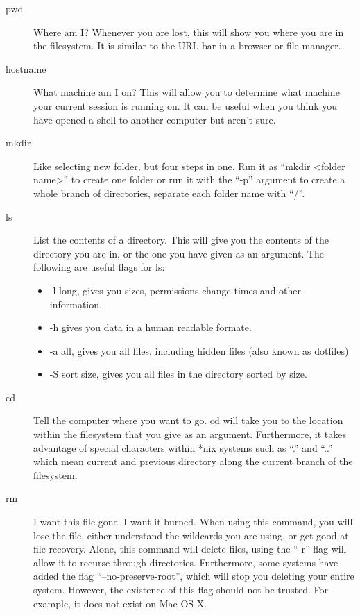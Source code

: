 \documentclass[a4paper,11pt]{report}
\begin{document}
		\begin{description}
			\item[pwd]
				Where am I?
				Whenever you are lost, this will show you where you are in the filesystem. 
				It is similar to the URL bar in a browser or file manager. 
			\item[hostname]
				What machine am I on?
				This will allow you to determine what machine your current session is running on. 
				It can be useful when you think you have opened a shell to another computer but aren't sure. 
			\item[mkdir]
				Like selecting new folder, but four steps in one. 
				Run it as ``mkdir <folder name>'' to create one folder or run it with the ``-p'' argument to create a whole branch of directories, separate each folder name with ``/''. 
			\item[ls]
				List the contents of a directory.
				This will give you the contents of the directory you are in, or the one you have given as an argument. 
				The following are useful flags for ls:
				\begin{itemize}
					\item -l long, gives you sizes, permissions change times and other information. 
					\item -h gives you data in a human readable formate. 
					\item -a all, gives you all files, including hidden files (also known as dotfiles)
					\item -S sort size, gives you all files in the directory sorted by size. 
				\end{itemize}
			\item[cd]
				Tell the computer where you want to go. 
				cd will take you to the location within the filesystem that you give as an argument. 
				Furthermore, it takes advantage of special characters within \**nix systems such as ``.'' and ``..'' which mean current and previous directory along the current branch of the filesystem. 
			\item[rm]
				I want this file gone. I want it burned. 
				When using this command, you will lose the file, either understand the wildcards you are using, or get good at file recovery. 
				Alone, this command will delete files, using the ``-r'' flag will allow it to recurse through directories. 
				Furthermore, some systems have added the flag ``--no-preserve-root'', which will stop you deleting your entire system. However, the existence of this flag should not be trusted. 
				For example, it does not exist on Mac OS X. 

\end{description}
\end{document}
